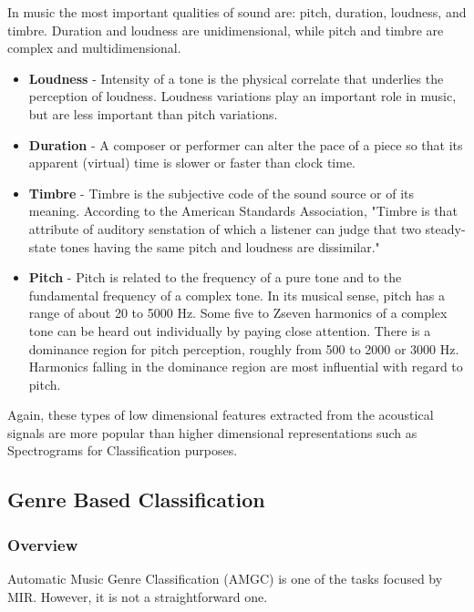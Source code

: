 In music the most important qualities of sound are: pitch, duration, loudness, and timbre. Duration and loudness are unidimensional, while pitch and timbre are complex and multidimensional. \cite{dooling2014}

\begin{itemize}
        \item \textbf{Loudness} - Intensity of a tone is the physical correlate that underlies the perception of loudness. Loudness variations play an important role in music, but are less important than pitch variations.

        \item \textbf{Duration} - A composer or performer can alter the pace of a piece so that its apparent (virtual) time is slower or faster than clock time. 

        \item \textbf{Timbre} - Timbre is the subjective code of the sound source or of its meaning. According to the American Standards Association, "Timbre
                is that attribute of auditory senstation of which a listener can judge that two steady-state tones having the same pitch and loudness are dissimilar."

        \item \textbf{Pitch} - Pitch is related to the frequency of a pure tone and to the fundamental frequency of a complex tone. In its musical sense, pitch
                has a range of about 20 to 5000 Hz. Some five to Zseven harmonics of a complex tone can be heard out individually by paying close attention. There
                is a dominance region for pitch perception, roughly from 500 to 2000 or 3000 Hz. Harmonics falling in the dominance region are most influential 
                with regard to pitch.

\end{itemize}

Again, these types of low dimensional features extracted from the acoustical signals are more popular than higher dimensional representations such as
Spectrograms for Classification purposes. \cite{prasad2007}

\subsection{Genre Based Classification}

\subsubsection{Overview}
Automatic Music Genre Classification (AMGC) is one of the tasks focused by MIR. However, it is not a straightforward one.

